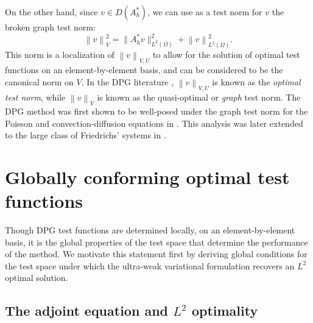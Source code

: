 \documentclass[11pt,onecolumn]{scrartcl}
\newcommand{\nor}[1]{\left\| #1 \right\|}
\newcommand{\LRp}[1]{\left( #1 \right)}
\renewcommand{\L}{L^2\LRp{\Omega}}
\begin{document}
On the other hand, since $v \in D\LRp{A^*_h}$, we can use as a test norm for $v$ the broken graph test norm: 
\[
\nor{v}_V^2 =  \|A_h^*v\|_{\L}^2 + \nor{v}_{\L}^2.
\]
This norm is a localization of $\nor{v}_{V,U}$ to allow for the solution of optimal test functions on an element-by-element basis, and can be considered to be the canonical norm on $V$.  In the DPG literature \cite{DPG4}, $\nor{v}_{V,U}$ is known as the {\em optimal test norm}, while $\nor{v}_{V}$ is known as the quasi-optimal or {\em graph} test norm.  The DPG method was first shown to be well-posed under the graph test norm for the Poisson and convection-diffusion equations in \cite{analysisDPG}.  This analysis was later extended to the large class of Friedrichs' systems in \cite{Bui-ThanhDemkowiczGhattas11b}.  %

\section{Globally conforming optimal test functions}

Though DPG test functions are determined locally, on an element-by-element basis, it is the global properties of the test space that determine the performance of the method.  We motivate this statement first by deriving global conditions for the test space under which the ultra-weak variational formulation recovers an $L^2$ optimal solution.  

\subsection{The adjoint equation and $L^2$ optimality}
\end{document}

